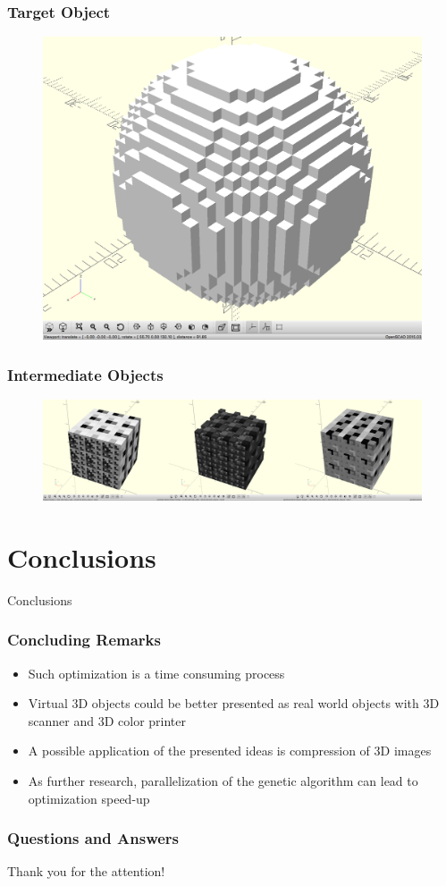 \documentclass{beamer}
\begin{document}
\begin{frame}
\frametitle{Target Object}
\begin{figure}[h]
  \centering
  \includegraphics[width=0.75\linewidth]{pic02}
\label{figure04}
\end{figure}
\end{frame}

\begin{frame}
\frametitle{Intermediate Objects}
\begin{figure}[h]
  \centering
  \includegraphics[width=1.00\linewidth]{pic03}
\label{figure05}
\end{figure}
\end{frame}

\section{Conclusions}

\begin{frame}
\center \huge{Conclusions}
\end{frame}

\begin{frame}
\frametitle{Concluding Remarks}
\begin{itemize}
  \item Such optimization is a time consuming process
  \item Virtual 3D objects could be better presented as real world objects with 3D scanner and 3D color printer
  \item A possible application of the presented ideas is compression of 3D images
  \item As further research, parallelization of the genetic algorithm can lead to optimization speed-up
\end{itemize}
\end{frame}

\begin{frame}
\frametitle{Questions and Answers}
\center \huge{Thank you for the attention!}
\end{frame}
\end{document}
